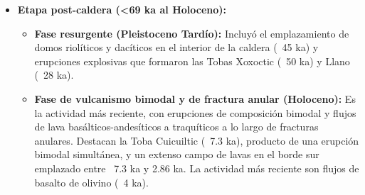 \begin{itemize}
    \item \textbf{Etapa post-caldera (<69 ka al Holoceno):} 
    \begin{itemize}
        \item \textbf{Fase resurgente (Pleistoceno Tardío):} Incluyó el emplazamiento de domos riolíticos y dacíticos en el interior de la caldera (~45 ka) y erupciones explosivas que formaron las Tobas Xoxoctic (~50 ka) y Llano (~28 ka).
        \item \textbf{Fase de vulcanismo bimodal y de fractura anular (Holoceno):} Es la actividad más reciente, con erupciones de composición bimodal y flujos de lava basálticos-andesíticos a traquíticos a lo largo de fracturas anulares. Destacan la Toba Cuicuiltic (~7.3 ka), producto de una erupción bimodal simultánea, y un extenso campo de lavas en el borde sur emplazado entre ~7.3 ka y 2.86 ka. La actividad más reciente son flujos de basalto de olivino (~4 ka).
    \end{itemize}
    
\end{itemize}
